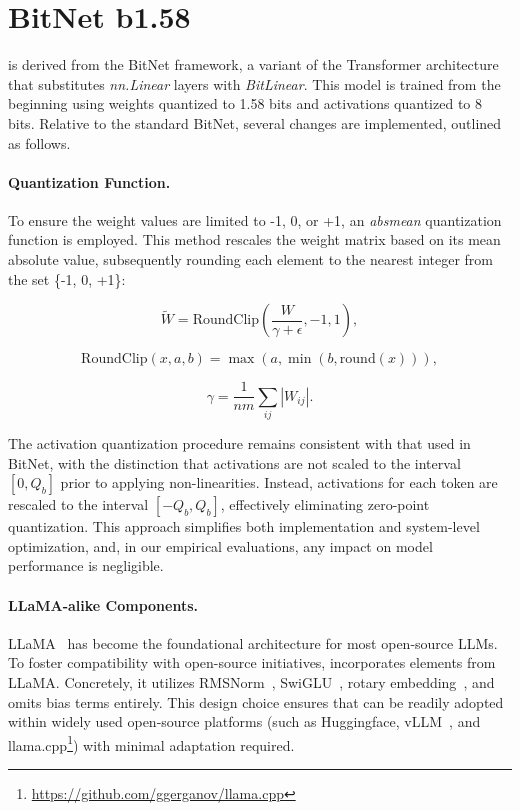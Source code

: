 \section{BitNet b1.58}

 is derived from the BitNet framework, a variant of the Transformer architecture that substitutes \emph{nn.Linear} layers with \emph{BitLinear}. This model is trained from the beginning using weights quantized to 1.58 bits and activations quantized to 8 bits. Relative to the standard BitNet, several changes are implemented, outlined as follows.

\paragraph{Quantization Function.} To ensure the weight values are limited to -1, 0, or +1, an \emph{absmean} quantization function is employed. This method rescales the weight matrix based on its mean absolute value, subsequently rounding each element to the nearest integer from the set \{-1, 0, +1\}:

\begin{equation}
    \widetilde{W} = \mathrm{RoundClip}(\frac{W}{\gamma + \epsilon}, -1, 1),
\end{equation}

\begin{equation}
    \mathrm{RoundClip}(x, a, b) = \max(a, \min(b, \mathrm{round}(x))),
\end{equation}

\begin{equation}
    \gamma = \frac{1}{nm}\sum_{ij} |W_{ij}|.
\end{equation}

The activation quantization procedure remains consistent with that used in BitNet, with the distinction that activations are not scaled to the interval $[0, Q_b]$ prior to applying non-linearities. Instead, activations for each token are rescaled to the interval $[-Q_b, Q_b]$, effectively eliminating zero-point quantization. This approach simplifies both implementation and system-level optimization, and, in our empirical evaluations, any impact on model performance is negligible.

\paragraph{LLaMA-alike Components.}

LLaMA~\cite{llama, llama2} has become the foundational architecture for most open-source LLMs. To foster compatibility with open-source initiatives,  incorporates elements from LLaMA. Concretely, it utilizes RMSNorm~\cite{rmsnorm}, SwiGLU~\cite{swiglu}, rotary embedding~\cite{rope}, and omits bias terms entirely. This design choice ensures that  can be readily adopted within widely used open-source platforms (such as Huggingface, vLLM~\cite{vllm}, and llama.cpp\footnote{\url{https://github.com/ggerganov/llama.cpp}}) with minimal adaptation required.

